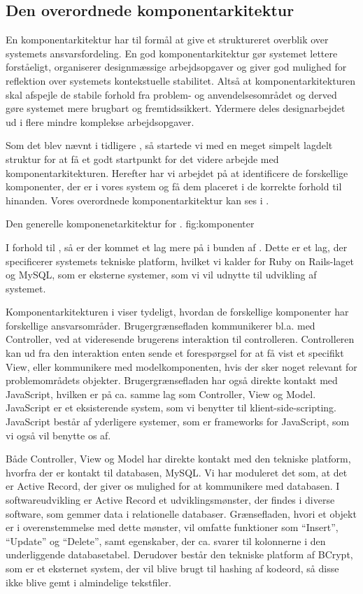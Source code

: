 \subsection{Den overordnede komponentarkitektur}
\label{sec:overordnetkomponent}
En komponentarkitektur har til formål at give et struktureret overblik over systemets ansvarsfordeling. En god komponentarkitektur gør systemet lettere forståeligt, organiserer designmæssige arbejdsopgaver og giver god mulighed for reflektion over systemets kontekstuelle stabilitet. Altså at komponentarkitekturen skal afspejle de stabile forhold fra problem- og anvendelsesområdet og derved gøre systemet mere brugbart og fremtidssikkert. Ydermere deles designarbejdet ud i flere mindre komplekse arbejdsopgaver. 

Som det blev nævnt i tidligere , så startede vi med en meget simpelt lagdelt struktur for at få et godt startpunkt for det videre arbejde med komponentarkitekturen. Herefter har vi arbejdet på at identificere de forskellige komponenter, der er i vores system og få dem placeret i de korrekte forhold til hinanden. Vores overordnede komponentarkitektur kan ses i .

	{Den generelle komponenetarkitektur for \Foodl{}.}
	{fig:komponenter}

I forhold til , så er der kommet et lag mere på i bunden af . Dette er et lag, der specificerer systemets tekniske platform, hvilket vi kalder for Ruby on Rails-laget og MySQL, som er eksterne systemer, som vi vil udnytte til udvikling af systemet.

Komponentarkitekturen i  viser tydeligt, hvordan de forskellige komponenter har forskellige ansvarsområder. 
Brugergrænsefladen kommunikerer bl.a. med Controller, ved at videresende brugerens interaktion til controlleren. Controlleren kan ud fra den interaktion enten sende et forespørgsel for at få vist et specifikt View, eller kommunikere med modelkomponenten, hvis der sker noget relevant for problemområdets objekter. Brugergrænsefladen har også direkte kontakt med JavaScript, hvilken er på ca. samme lag som Controller, View og Model. JavaScript er et eksisterende system, som vi benytter til klient-side-scripting. JavaScript består af yderligere systemer, som er frameworks for JavaScript, som vi også vil benytte os af.

Både Controller, View og Model har direkte kontakt med den tekniske platform, hvorfra der er kontakt til databasen, MySQL. Vi har moduleret det som, at det er Active Record, der giver os mulighed for at kommunikere med databasen. I softwareudvikling er Active Record et udviklingsmønster, der findes i diverse software, som gemmer data i relationelle databaser. Grænsefladen, hvori et objekt er i overenstemmelse med dette mønster, vil omfatte funktioner som ``Insert'', ``Update'' og ``Delete'', samt egenskaber, der ca. svarer til kolonnerne i den underliggende databasetabel.\cite{activerecordwiki} Derudover består den tekniske platform af BCrypt, som er et eksternet system, der vil blive brugt til hashing af kodeord, så disse ikke blive gemt i almindelige tekstfiler.

